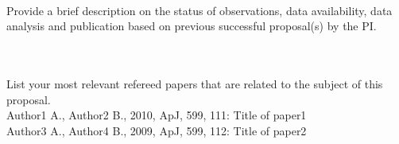 \documentclass[11pt]{article}            %
\begin{document}
   
\smallskip
{}
\smallskip\\
Provide a brief description on the status of observations, data availability, data analysis and publication based on previous successful proposal(s) by the PI.  

\smallskip
{}
\smallskip\\

\smallskip
{}
\smallskip\\
List your most relevant refereed papers that are related to the subject of this proposal. \\
Author1 A., Author2 B., 2010, ApJ, 599, 111: Title of paper1
\smallskip\\
Author3 A., Author4 B., 2009, ApJ, 599, 112: Title of paper2
\end{document}
